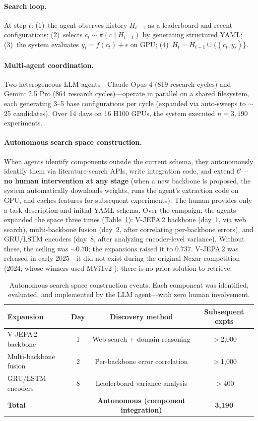 \documentclass{article}
\newcommand{\Cspace}{\mathcal{C}}
\begin{document}
\paragraph{Search loop.}
At step $t$: (1)~the agent observes history $H_{t-1}$ as a leaderboard and recent configurations; (2)~selects $c_t \sim \pi(c \mid H_{t-1})$ by generating structured YAML; (3)~the system evaluates $y_t = f(c_t) + \epsilon$ on GPU; (4)~$H_t = H_{t-1} \cup \{(c_t, y_t)\}$.

\paragraph{Multi-agent coordination.}
Two heterogeneous LLM agents---Claude Opus 4 (819 research cycles) and Gemini 2.5 Pro (864 research cycles)---operate in parallel on a shared filesystem, each generating 3--5 base configurations per cycle (expanded via auto-sweeps to $\sim$25 candidates). Over 14 days on 16 H100 GPUs, the system executed $n = 3{,}190$ experiments.

\paragraph{Autonomous search space construction.}
When agents identify components outside the current schema, they autonomously identify them via literature-search APIs, write integration code, and extend $\Cspace$---\textbf{no human intervention at any stage} (when a new backbone is proposed, the system automatically downloads weights, runs the agent's extraction code on GPU, and caches features for subsequent experiments). The human provides only a task description and initial YAML schema.
Over the campaign, the agents expanded the space three times (Table~\ref{tab:expansion}):
V-JEPA\,2 backbone (day~1, via web search),
multi-backbone fusion (day~2, after correlating per-backbone errors),
and GRU/LSTM encoders (day~8, after analyzing encoder-level variance).
Without these, the ceiling was $\sim$0.70; the expansions raised it to 0.737.
V-JEPA\,2 was released in early 2025---it did not exist during the original Nexar competition (2024, whose winners used MViTv2 \citep{nexar2024}); there is no prior solution to retrieve.

\begin{table}[t]
\centering
\caption{Autonomous search space construction events. Each component was identified, evaluated, and implemented by the LLM agent---with zero human involvement.}
\label{tab:expansion}
\small
\begin{tabular}{@{}lccc@{}}
\toprule
Expansion & Day & Discovery method & Subsequent expts \\
\midrule
V-JEPA\,2 backbone & 1 & Web search + domain reasoning & $>$2{,}000 \\
Multi-backbone fusion & 2 & Per-backbone error correlation & $>$1{,}000 \\
GRU/LSTM encoders & 8 & Leaderboard variance analysis & $>$400 \\
\midrule
\textbf{Total} & & \textbf{Autonomous (component integration)} & \textbf{3{,}190} \\
\bottomrule
\end{tabular}
\end{table}
\end{document}
